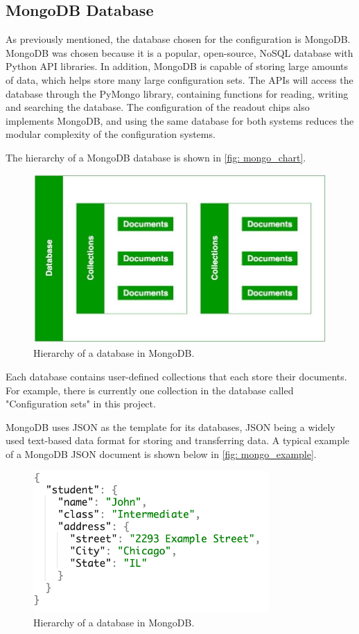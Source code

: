 \documentclass[main.tex]{subfiles}
\begin{document}
\subsection{MongoDB Database}
\label{ssec: mongo}
As previously mentioned, the database chosen for the configuration is MongoDB. MongoDB was chosen because it is a popular, open-source, NoSQL database with Python API libraries. In addition, MongoDB is capable of storing large amounts of data, which helps store many large configuration sets. The APIs will access the database through the PyMongo library, containing functions for reading, writing and searching the database. The configuration of the readout chips also implements MongoDB, and using the same database for both systems reduces the modular complexity of the configuration systems.

The hierarchy of a MongoDB database is shown in \autoref{fig: mongo_chart}.

\begin{figure}[!ht]
    \centering
    \includegraphics[width=12cm, scale=1.5]{images/mongodb-nosql-working.jpg}
    \caption{Hierarchy of a database in MongoDB.}
    \label{fig: mongo_chart}
\end{figure}
\FloatBarrier

Each database contains user-defined collections that each store their documents. For example, there is currently one collection in the database called "Configuration sets" in this project.

MongoDB uses JSON as the template for its databases, JSON being a widely used text-based data format for storing and transferring data. A typical example of a MongoDB JSON document is shown below in \autoref{fig: mongo_example}.

\begin{figure}[!ht]
    \centering
    \includegraphics[width=9cm, scale=1.5]{images/mongodb_document_example.png}
    \caption{Hierarchy of a database in MongoDB.}
    \label{fig: mongo_example}
\end{figure}
\FloatBarrier
\end{document}
